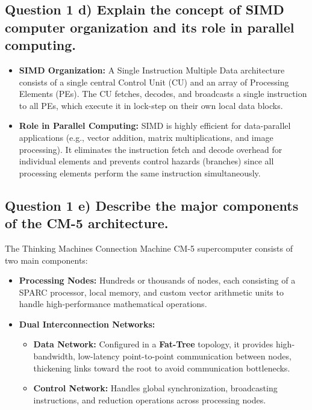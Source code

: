 \documentclass[11pt, a4paper]{article}
\begin{document}
\subsection*{Question 1 d) Explain the concept of SIMD computer organization and its role in parallel computing.}
\begin{itemize}
    \item \textbf{SIMD Organization:} A Single Instruction Multiple Data architecture consists of a single central Control Unit (CU) and an array of Processing Elements (PEs). The CU fetches, decodes, and broadcasts a single instruction to all PEs, which execute it in lock-step on their own local data blocks.
    \item \textbf{Role in Parallel Computing:} SIMD is highly efficient for data-parallel applications (e.g., vector addition, matrix multiplications, and image processing). It eliminates the instruction fetch and decode overhead for individual elements and prevents control hazards (branches) since all processing elements perform the same instruction simultaneously.
\end{itemize}

\subsection*{Question 1 e) Describe the major components of the CM-5 architecture.}
The Thinking Machines Connection Machine CM-5 supercomputer consists of two main components:
\begin{itemize}
    \item \textbf{Processing Nodes:} Hundreds or thousands of nodes, each consisting of a SPARC processor, local memory, and custom vector arithmetic units to handle high-performance mathematical operations.
    \item \textbf{Dual Interconnection Networks:}
    \begin{itemize}
        \item \textbf{Data Network:} Configured in a \textbf{Fat-Tree} topology, it provides high-bandwidth, low-latency point-to-point communication between nodes, thickening links toward the root to avoid communication bottlenecks.
        \item \textbf{Control Network:} Handles global synchronization, broadcasting instructions, and reduction operations across processing nodes.
    \end{itemize}
\end{itemize}

\newpage
\end{document}
